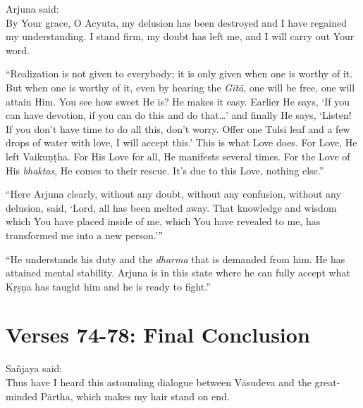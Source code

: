 {\hspace*{1em}Arjuna said: \\
By Your grace, O Acyuta, my delusion has been destroyed and I have regained my understanding. I stand firm, my doubt has left me, and I will carry out Your word.}

\enquote{Realization is not given to everybody; it is only given when one is worthy of it. But when one is worthy of it, even by hearing the \textit{Gītā}, one will be free, one will attain Him. You see how sweet He is? He makes it easy. Earlier He says, \enquote{If you can have devotion, if you can do this and do that\ldots} and finally He says, \enquote{Listen! If you don’t have time to do all this, don’t worry. Offer one Tulsī leaf and a few drops of water with love, I will accept this.} This is what Love does. For Love, He left Vaikuṇṭha. For His Love for all, He manifests several times. For the Love of His \textit{bhaktas}, He comes to their rescue. It’s due to this Love, nothing else.}

\enquote{Here Arjuna clearly, without any doubt, without any confusion, without any delusion, said, \enquote{Lord, all has been melted away. That knowledge and wisdom which You have placed inside of me, which You have revealed to me, has transformed me into a new person.}}

\enquote{He understands his duty and the \textit{dharma} that is demanded from him. He has attained mental stability. Arjuna is in this state where he can fully accept what Kṛṣṇa has taught him and he is ready to fight.}

\section{Verses 74-78: Final Conclusion}\label{sec-verses-74-78-final-conclusion}

{\hspace*{1em}Sañjaya said: \\
Thus have I heard this astounding dialogue between Vāsudeva and the great-minded Pārtha, which makes my hair stand on end.}

